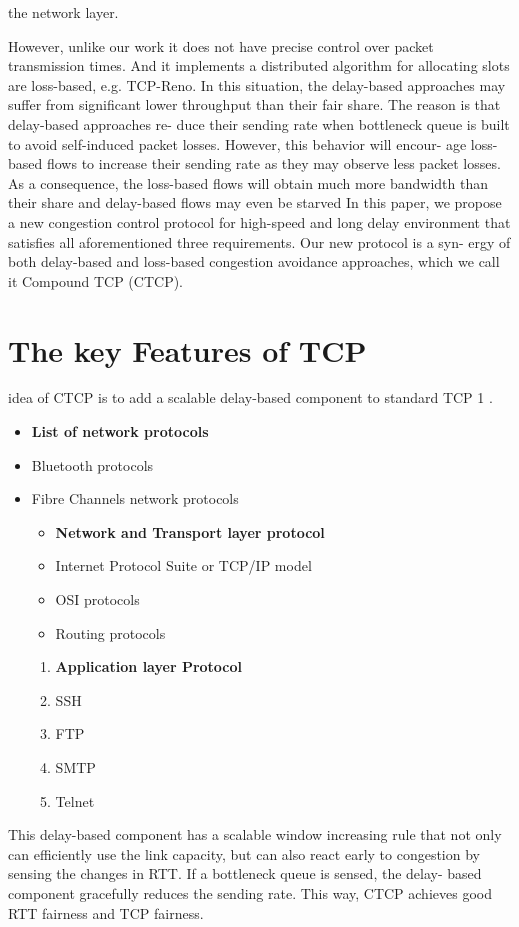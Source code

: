 \documentclass[a4paper,11pt,twocolumn,dvips]{report}
\begin{document}
the network layer.

 However, unlike our work it does not
have precise control over packet transmission times. And
it implements a distributed algorithm for allocating slots
are loss-based, e.g. TCP-Reno. In this situation, the delay-based
approaches may suffer from significant lower throughput than
their fair share. The reason is that delay-based approaches re-
duce their sending rate when bottleneck queue is built to avoid\cite{wiki}
self-induced packet losses. However, this behavior will encour-
age loss-based flows to increase their sending rate as they may
observe less packet losses. As a consequence, the loss-based
flows will obtain much more bandwidth than their share and
delay-based flows may even be starved 
In this paper, we propose a new congestion control protocol
for high-speed and long delay environment that satisfies all
aforementioned three requirements. Our new protocol is a syn-
ergy of both delay-based and loss-based congestion avoidance
approaches, which we call it Compound TCP (CTCP).

\section{The key Features of TCP}
\label{sec-section}

idea of CTCP is to add a scalable delay-based component to
standard TCP 1 .
\begin{itemize}
 \item {\bf List of network protocols}
 \item Bluetooth protocols
 \item Fibre Channels network protocols
 \begin{itemize}
 \item{\bf Network and Transport layer protocol}
 \item Internet Protocol Suite or TCP/IP model 
 \item OSI protocols
 \item Routing protocols
  \end{itemize}
 \begin{enumerate}
 \item {\bf Application layer Protocol}
 \item SSH
 \item FTP
 \item SMTP
 \item Telnet
 \end{enumerate}
 
 \end{itemize} This delay-based component has a scalable
window increasing rule that not only can efficiently use the link
capacity, but can also react early to congestion by sensing the
changes in RTT. If a bottleneck queue is sensed, the delay-
based component gracefully reduces the sending rate. This way,
CTCP achieves good RTT fairness and TCP fairness.
\end{document}
